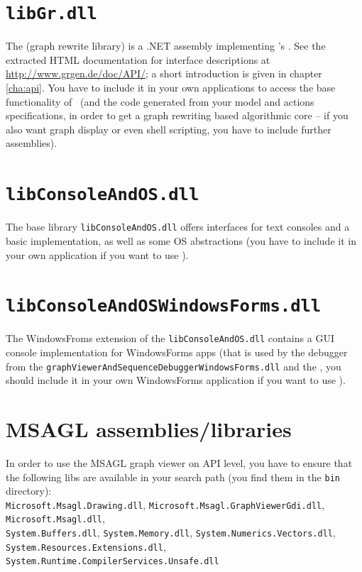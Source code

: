 \section{\texttt{libGr.dll}}
\label{sct:API}
The \LibGr{} (graph rewrite library) is a .NET assembly implementing \GrG's .
See the extracted HTML documentation for interface descriptions at \url{http://www.grgen.de/doc/API/};
a short introduction is given in chapter \ref{cha:api}.
You have to include it in your own applications to access the base functionality of \GrG\ (and the code generated from your model and actions specifications, in order to get a graph rewriting based algorithmic core -- if you also want graph display or even shell scripting, you have to include further assemblies).

\section{\texttt{libConsoleAndOS.dll}}
The base library \texttt{libConsoleAndOS.dll} offers interfaces for text consoles and a basic implementation, as well as some OS abstractions (you have to include it in your own application if you want to use \GrG).

\section{\texttt{libConsoleAndOSWindowsForms.dll}}
The WindowsFroms extension of the \texttt{libConsole\-And\-OS.dll} contains a GUI console implementation for WindowsForms apps (that is used by the debugger from the \texttt{graph\-Viewer\-And\-Sequence\-Debugger\-Windows\-Forms.dll} and the \GGrShell, you should include it in your own WindowsForms application if you want to use \GrG).

\section{MSAGL assemblies/libraries}
In order to use the MSAGL graph viewer on API level, you have to ensure that the following libs are available in your search path (you find them in the \texttt{bin} directory):\\
\texttt{Microsoft.Msagl.Drawing.dll},
\texttt{Microsoft.Msagl.GraphViewerGdi.dll},
\texttt{Microsoft.Msagl.dll},\\
\texttt{System.Buffers.dll},
\texttt{System.Memory.dll},
\texttt{System.Numerics.Vectors.dll},\\
\texttt{System.Resources.Extensions.dll},
\texttt{System.Runtime.CompilerServices.Unsafe.dll}

